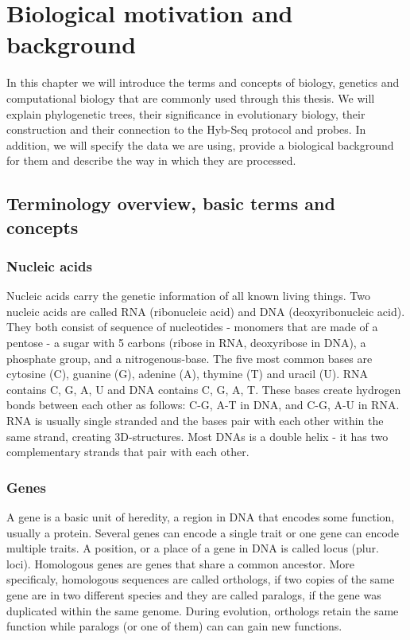 \chapter[Biological motivation]{Biological motivation and background}
\label{kap:biological_motivation}

In this chapter we will introduce the terms and concepts of biology, genetics and computational biology that 
are commonly used through this thesis. 
We will explain phylogenetic trees, their significance in evolutionary biology, their construction and 
their connection to the Hyb-Seq protocol and probes. In addition, we will specify the data we are using, provide 
a biological background for them and describe the way in which they are processed. 

\section{Terminology overview, basic terms and concepts}

\subsection{Nucleic acids}
Nucleic acids carry the genetic information of all known living things. Two nucleic acids are called RNA 
(ribonucleic acid) and DNA (deoxyribonucleic acid). They both consist of sequence of nucleotides 
- monomers that are made of a pentose - a sugar with 5 carbons (ribose in RNA, deoxyribose in DNA), a 
phosphate group, and a nitrogenous-base. The five most common bases are cytosine (C), guanine (G), 
adenine (A), thymine (T) and uracil (U). RNA contains C, G, A, U and DNA contains C, G, A, T. These bases 
create hydrogen bonds between each other as follows: C-G, A-T in DNA, and C-G, A-U in RNA. 
RNA is usually single stranded and the bases pair with each other within the same strand, creating 3D-structures. 
Most DNAs is a double helix - it has two complementary strands that pair with each other. 

\subsection{Genes}
A gene is a basic unit of heredity, a region in DNA that encodes some function, usually a protein. Several genes 
can encode a single trait or one gene can encode multiple traits. A position, or a place of a gene in DNA is called 
locus (plur. loci). Homologous genes are genes that share a common ancestor. More specificaly, homologous sequences are 
called orthologs, if two copies of the same gene are in two different species and they are called paralogs, if the gene was 
duplicated within the same genome. During evolution, orthologs retain the same function while paralogs (or one of them) can 
can gain new functions. 


